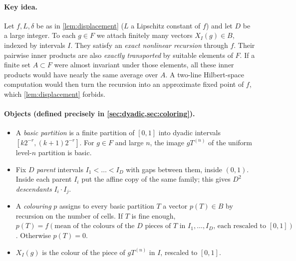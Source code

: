 \documentclass[11pt]{article}
\theoremstyle{definition}
\numberwithin{equation}{section}
\begin{document}
\paragraph{Key idea.}
Let \(f,L,\delta\) be as in \cref{lem:displacement} (\(L\) a Lipschitz
constant of \(f\)) and let \(D\) be a large integer.
To each \(g\in F\) we attach finitely many vectors \(X_I(g)\in B\),
indexed by intervals \(I\). They satisfy an \emph{exact nonlinear recursion}
through \(f\). Their pairwise inner products are also \emph{exactly
transported} by suitable elements of \(F\).
If a finite set \(A\subset F\) were almost invariant under those elements,
all these inner products would have nearly the same average over \(A\).
A two-line Hilbert-space computation would then turn the recursion into an
approximate fixed point of \(f\), which \cref{lem:displacement} forbids.

\paragraph{Objects (defined precisely in \cref{sec:dyadic,sec:coloring}).}
\begin{itemize}
\item A \emph{basic partition} is a finite partition of \([0,1]\) into
dyadic intervals \([k2^{-r},(k+1)2^{-r}]\). For \(g\in F\) and large \(n\),
the image \(gT^{(n)}\) of the uniform level-\(n\) partition is basic.
\item Fix \(D\) \emph{parent} intervals \(I_1<\dots<I_D\) with gaps between
them, inside \((0,1)\). Inside each parent \(I_i\) put the affine copy of the
same family; this gives \(D^2\) \emph{descendants} \(I_i\cdot I_j\).
\item A \emph{colouring} \(p\) assigns to every basic partition \(T\) a
vector \(p(T)\in B\) by recursion on the number of cells. If \(T\) is fine
enough, \(p(T)=f(\text{mean of the colours of the }D\text{ pieces of }T
\text{ in }I_1,\dots,I_D\text{, each rescaled to }[0,1])\). Otherwise
\(p(T)=0\).
\item \(X_I(g)\) is the colour of the piece of \(gT^{(n)}\) in \(I\),
rescaled to \([0,1]\).
\end{itemize}
\end{document}
